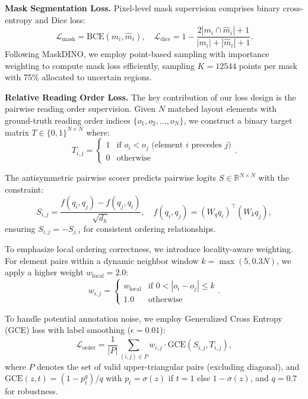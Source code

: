 \documentclass[11pt, a4paper,logo,  copyright, nonumbering]{paddleocr}
\begin{document}
\textbf{Mask Segmentation Loss.}
Pixel-level mask supervision comprises binary cross-entropy and Dice loss:
\begin{equation}
    \mathcal{L}_{\text{mask}} = \text{BCE}(m_i, \hat{m}_i), \quad
    \mathcal{L}_{\text{dice}} = 1 - \frac{2|m_i \cap \hat{m}_i| + 1}{|m_i| + |\hat{m}_i| + 1}.
\end{equation}
Following MaskDINO, we employ point-based sampling with importance weighting to compute mask loss efficiently, sampling $K=12544$ points per mask with 75\% allocated to uncertain regions.

\textbf{Relative Reading Order Loss.}
The key contribution of our loss design is the pairwise reading order supervision. Given $N$ matched layout elements with ground-truth reading order indices $\{o_1, o_2, \ldots, o_N\}$, we construct a binary target matrix $T \in \{0, 1\}^{N \times N}$ where:
\begin{equation}
    T_{i,j} = \begin{cases}
        1 & \text{if } o_i < o_j \text{ (element $i$ precedes $j$)}\\
        0 & \text{otherwise}
    \end{cases}.
\end{equation}

The antisymmetric pairwise scorer predicts pairwise logits $S \in \mathbb{R}^{N \times N}$ with the constraint:
\begin{equation}
    S_{i,j} = \frac{f(q_i, q_j) - f(q_j, q_i)}{\sqrt{d_h}}, \quad f(q_i, q_j) = (W_q q_i)^\top (W_k q_j),
\end{equation}
ensuring $S_{i,j} = -S_{j,i}$ for consistent ordering relationships.

To emphasize local ordering correctness, we introduce locality-aware weighting. For element pairs within a dynamic neighbor window $k = \max(5, 0.3N)$, we apply a higher weight $w_{\text{local}}=2.0$:
\begin{equation}
    w_{i,j} = \begin{cases}
        w_{\text{local}} & \text{if } 0 < |o_i - o_j| \leq k\\
        1.0 & \text{otherwise}
    \end{cases}.
\end{equation}

To handle potential annotation noise, we employ Generalized Cross Entropy (GCE) loss with label smoothing ($\epsilon=0.01$):
\begin{equation}
    \mathcal{L}_{\text{order}} = \frac{1}{|P|} \sum_{(i,j) \in P} w_{i,j} \cdot \text{GCE}(S_{i,j}, T_{i,j}),
\end{equation}
where $P$ denotes the set of valid upper-triangular pairs (excluding diagonal), and $\text{GCE}(z, t) = (1 - p_t^q)/q$ with $p_t = \sigma(z)$ if $t=1$ else $1-\sigma(z)$, and $q=0.7$ for robustness.
\end{document}
